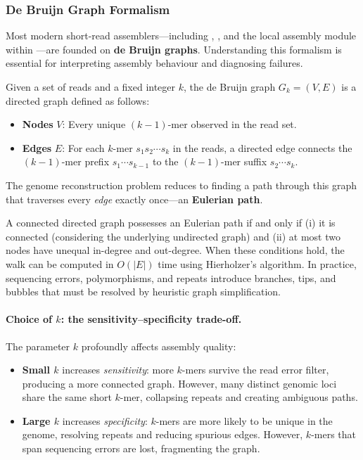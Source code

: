 \subsubsection{De Bruijn Graph Formalism}
\label{subsubsec:genomeseq:debruijn}

Most modern short-read assemblers---including , , and the local assembly module within ---are founded on \textbf{de Bruijn graphs}. Understanding this formalism is essential for interpreting assembly behaviour and diagnosing failures.

\begin{keyconcept}[title={Definition of a de Bruijn Graph}]
Given a set of reads and a fixed integer $k$, the de Bruijn graph $G_k = (V, E)$ is a directed graph defined as follows:
\begin{itemize}[nosep]
  \item \textbf{Nodes} $V$: Every unique $(k{-}1)$-mer observed in the read set.
  \item \textbf{Edges} $E$: For each $k$-mer $s_1 s_2 \cdots s_k$ in the reads, a directed edge connects the $(k{-}1)$-mer prefix $s_1 \cdots s_{k-1}$ to the $(k{-}1)$-mer suffix $s_2 \cdots s_k$.
\end{itemize}
The genome reconstruction problem reduces to finding a path through this graph that traverses every \emph{edge} exactly once---an \textbf{Eulerian path}.
\end{keyconcept}

A connected directed graph possesses an Eulerian path if and only if (i) it is connected (considering the underlying undirected graph) and (ii) at most two nodes have unequal in-degree and out-degree. When these conditions hold, the walk can be computed in $O(|E|)$ time using Hierholzer's algorithm. In practice, sequencing errors, polymorphisms, and repeats introduce branches, tips, and bubbles that must be resolved by heuristic graph simplification.

\paragraph{Choice of $k$: the sensitivity--specificity trade-off.}
The parameter $k$ profoundly affects assembly quality:

\begin{itemize}[nosep]
  \item \textbf{Small $k$} increases \emph{sensitivity}: more $k$-mers survive the read error filter, producing a more connected graph. However, many distinct genomic loci share the same short $k$-mer, collapsing repeats and creating ambiguous paths.
  \item \textbf{Large $k$} increases \emph{specificity}: $k$-mers are more likely to be unique in the genome, resolving repeats and reducing spurious edges. However, $k$-mers that span sequencing errors are lost, fragmenting the graph.
\end{itemize}

